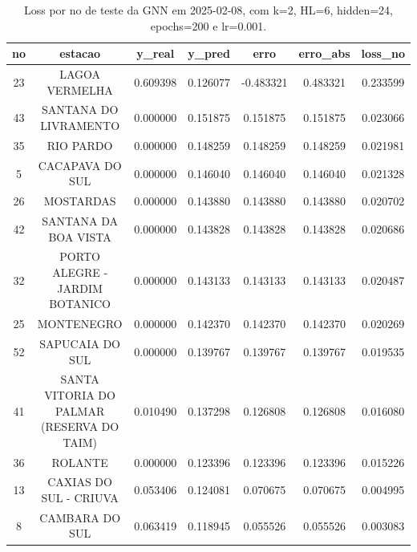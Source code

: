 \begin{table}[h]
\centering
\caption{Loss por no de teste da GNN em 2025-02-08, com k=2, HL=6, hidden=24, epochs=200 e lr=0.001.}
\label{tab:gnn_loss_k2_hl6_h24_e200_d20250208}
\begin{tabular}{ccccccc}
\toprule
no & estacao & y\_real & y\_pred & erro & erro\_abs & loss\_no \\
\midrule
23 & LAGOA VERMELHA & 0.609398 & 0.126077 & -0.483321 & 0.483321 & 0.233599 \\
43 & SANTANA DO LIVRAMENTO & 0.000000 & 0.151875 & 0.151875 & 0.151875 & 0.023066 \\
35 & RIO PARDO & 0.000000 & 0.148259 & 0.148259 & 0.148259 & 0.021981 \\
5 & CACAPAVA DO SUL & 0.000000 & 0.146040 & 0.146040 & 0.146040 & 0.021328 \\
26 & MOSTARDAS & 0.000000 & 0.143880 & 0.143880 & 0.143880 & 0.020702 \\
42 & SANTANA DA BOA VISTA & 0.000000 & 0.143828 & 0.143828 & 0.143828 & 0.020686 \\
32 & PORTO ALEGRE - JARDIM BOTANICO & 0.000000 & 0.143133 & 0.143133 & 0.143133 & 0.020487 \\
25 & MONTENEGRO & 0.000000 & 0.142370 & 0.142370 & 0.142370 & 0.020269 \\
52 & SAPUCAIA DO SUL & 0.000000 & 0.139767 & 0.139767 & 0.139767 & 0.019535 \\
41 & SANTA VITORIA DO PALMAR (RESERVA DO TAIM) & 0.010490 & 0.137298 & 0.126808 & 0.126808 & 0.016080 \\
36 & ROLANTE & 0.000000 & 0.123396 & 0.123396 & 0.123396 & 0.015226 \\
13 & CAXIAS DO SUL - CRIUVA & 0.053406 & 0.124081 & 0.070675 & 0.070675 & 0.004995 \\
8 & CAMBARA DO SUL & 0.063419 & 0.118945 & 0.055526 & 0.055526 & 0.003083 \\
\bottomrule
\end{tabular}
\end{table}
